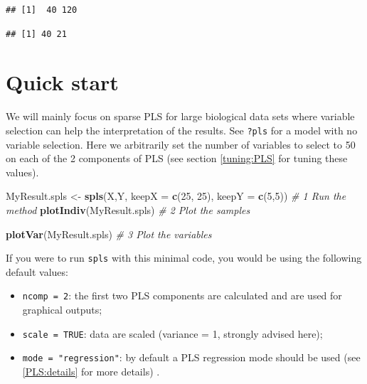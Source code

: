 \documentclass[]{book}
\newenvironment{Shaded}{\begin{snugshade}}{\end{snugshade}}
\newcommand{\KeywordTok}[1]{\textcolor[rgb]{0.13,0.29,0.53}{\textbf{#1}}}
\newcommand{\DataTypeTok}[1]{\textcolor[rgb]{0.13,0.29,0.53}{#1}}
\newcommand{\DecValTok}[1]{\textcolor[rgb]{0.00,0.00,0.81}{#1}}
\newcommand{\StringTok}[1]{\textcolor[rgb]{0.31,0.60,0.02}{#1}}
\newcommand{\CommentTok}[1]{\textcolor[rgb]{0.56,0.35,0.01}{\textit{#1}}}
\newcommand{\NormalTok}[1]{#1}
\providecommand{\tightlist}{%
  \setlength{\itemsep}{0pt}\setlength{\parskip}{0pt}}
\theoremstyle{definition}
\theoremstyle{definition}
\theoremstyle{definition}
\theoremstyle{remark}
\begin{document}
\begin{verbatim}
## [1]  40 120
\end{verbatim}

\begin{verbatim}
## [1] 40 21
\end{verbatim}

\section{Quick start}\label{quick-start-2}

We will mainly focus on sparse PLS for large biological data sets where
variable selection can help the interpretation of the results. See
\texttt{?pls} for a model with no variable selection. Here we
arbitrarily set the number of variables to select to 50 on each of the 2
components of PLS (see section \ref{tuning:PLS} for tuning these
values).

\begin{Shaded}
\begin{Highlighting}[]
\NormalTok{MyResult.spls <-}\StringTok{ }\KeywordTok{spls}\NormalTok{(X,Y, }\DataTypeTok{keepX =} \KeywordTok{c}\NormalTok{(}\DecValTok{25}\NormalTok{, }\DecValTok{25}\NormalTok{), }\DataTypeTok{keepY =} \KeywordTok{c}\NormalTok{(}\DecValTok{5}\NormalTok{,}\DecValTok{5}\NormalTok{))  }\CommentTok{# 1 Run the method}
\KeywordTok{plotIndiv}\NormalTok{(MyResult.spls)                                       }\CommentTok{# 2 Plot the samples}
\end{Highlighting}
\end{Shaded}

\begin{Shaded}
\begin{Highlighting}[]
\KeywordTok{plotVar}\NormalTok{(MyResult.spls)                                         }\CommentTok{# 3 Plot the  variables}
\end{Highlighting}
\end{Shaded}

If you were to run \texttt{spls} with this minimal code, you would be
using the following default values:

\begin{itemize}
\tightlist
\item
  \texttt{ncomp\ =\ 2}: the first two PLS components are calculated and
  are used for graphical outputs;
\item
  \texttt{scale\ =\ TRUE}: data are scaled (variance = 1, strongly
  advised here);
\item
  \texttt{mode\ =\ "regression"}: by default a PLS regression mode
  should be used (see \ref{PLS:details} for more details) .
\end{itemize}
\end{document}
